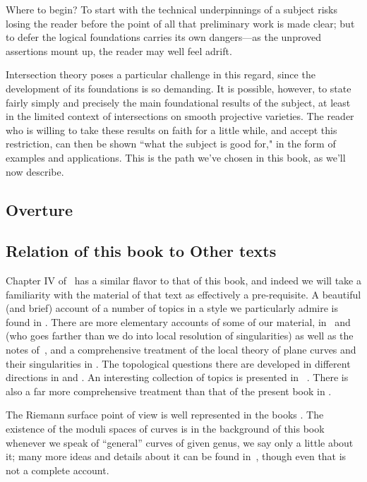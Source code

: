 Where to begin? To start with the technical underpinnings of a subject risks losing the reader before the point of all that preliminary work is made clear; but to defer the logical foundations carries its own dangers---as the unproved assertions mount up, the reader may well feel adrift.

Intersection theory poses a particular challenge in this regard, since the development of its foundations is so demanding. It is possible, however, to state fairly simply and precisely the main foundational results of the subject, at least in the limited context of intersections on smooth projective varieties. The reader who is willing to take these results on faith for a little while, and accept this restriction, can then be shown ``what the subject is good for," in the form of examples and applications. This is the path we've chosen in this book, as we'll now describe.

\subsection{Overture}



\subsection{Relation of this book to Other texts} 
Chapter IV of~\cite{Hartshorne1977} has a similar flavor to that of this book, and indeed we will take a familiarity with the material of that text as effectively a pre-requisite. A beautiful (and brief) account of a number of topics in a style we particularly admire is found in \cite{Mumford-C&J}.
There are more elementary accounts of some of our material, in~\cite{ Fulton 2008 } and \cite{Walker} (who goes farther than we do into local resolution of singularities) as well as the notes of~\cite{Griffiths***}, and a comprehensive treatment of the local theory of plane curves and their singularities in \cite{Brieskorn}. The topological questions there are developed in different directions in \cite{Milnor} and \cite{Eisenbud-Neumann}. An interesting collection of topics is presented in ~\cite{Clemens}.
There is also a far more comprehensive treatment than that of the present book in \cite{ACGH}.

 The Riemann surface point of view is well represented in the books \cite{Forster} \cite{Gunning} \cite{Kirwan}\cite{Miranda}. The existence of the moduli spaces of curves is in the background of this book whenever we speak of ``general'' curves of given genus, we say only a little about it; many more ideas and details about it can be found in~\cite{Harris-Morrison}, though even that is not a complete account.


